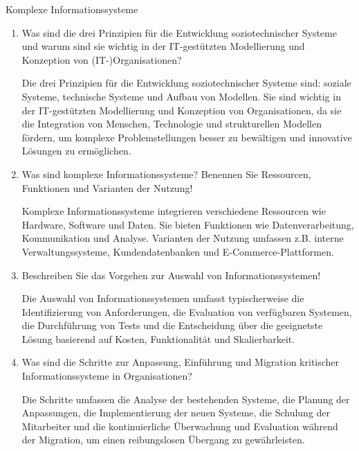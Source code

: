 \documentclass{article}
\begin{document}
\begin{exercise}{Komplexe Informationssysteme}
  \begin{enumerate}
    \item Was sind die drei Prinzipien für die Entwicklung soziotechnischer Systeme und warum sind sie wichtig in der IT-gestützten Modellierung und Konzeption von (IT-)Organisationen?
          \begin{solution}
            Die drei Prinzipien für die Entwicklung soziotechnischer Systeme sind: soziale Systeme, technische Systeme und Aufbau von Modellen. Sie sind wichtig in der IT-gestützten Modellierung und Konzeption von Organisationen, da sie die Integration von Menschen, Technologie und strukturellen Modellen fördern, um komplexe Problemstellungen besser zu bewältigen und innovative Lösungen zu ermöglichen.
          \end{solution}

    \item Was sind komplexe Informationssysteme? Benennen Sie Ressourcen, Funktionen und Varianten der Nutzung!
          \begin{solution}
            Komplexe Informationssysteme integrieren verschiedene Ressourcen wie Hardware, Software und Daten. Sie bieten Funktionen wie Datenverarbeitung, Kommunikation und Analyse. Varianten der Nutzung umfassen z.B. interne Verwaltungssysteme, Kundendatenbanken und E-Commerce-Plattformen.
          \end{solution}

    \item Beschreiben Sie das Vorgehen zur Auswahl von Informationssystemen!
          \begin{solution}
            Die Auswahl von Informationssystemen umfasst typischerweise die Identifizierung von Anforderungen, die Evaluation von verfügbaren Systemen, die Durchführung von Tests und die Entscheidung über die geeignetste Lösung basierend auf Kosten, Funktionalität und Skalierbarkeit.
          \end{solution}

    \item Was sind die Schritte zur Anpassung, Einführung und Migration kritischer Informationssysteme in Organisationen?
          \begin{solution}
            Die Schritte umfassen die Analyse der bestehenden Systeme, die Planung der Anpassungen, die Implementierung der neuen Systeme, die Schulung der Mitarbeiter und die kontinuierliche Überwachung und Evaluation während der Migration, um einen reibungslosen Übergang zu gewährleisten.
          \end{solution}


\end{enumerate}
\end{exercise}
\end{document}

